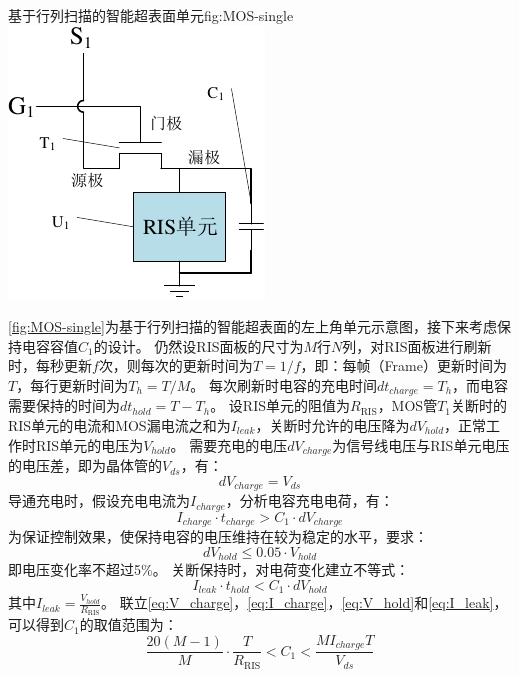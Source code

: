 \documentclass[supercite]{HustGraduPaper}
\begin{document}
\begin{generalfig}[htb]{基于行列扫描的智能超表面单元}{fig:MOS-single}
	\includegraphics[width=0.3\linewidth]{Figures/MOS-single.pdf}
\end{generalfig}

\autoref{fig:MOS-single}为基于行列扫描的智能超表面的左上角单元示意图，接下来考虑保持电容容值$C_1$的设计。
仍然设RIS面板的尺寸为$M$行$N$列，对RIS面板进行刷新时，每秒更新$f$次，则每次的更新时间为$T=1/f$，即：每帧（Frame）更新时间为$T$，每行更新时间为$T_h=T/M$。
每次刷新时电容的充电时间$dt_{charge}=T_h$，而电容需要保持的时间为$dt_{hold}=T-T_h$。
设RIS单元的阻值为$R_\mathrm{RIS}$，MOS管$T_1$关断时的RIS单元的电流和MOS漏电流之和为$I_{leak}$，关断时允许的电压降为$dV_{hold}$，正常工作时RIS单元的电压为$V_{hold}$。
需要充电的电压$dV_{charge}$为信号线电压与RIS单元电压的电压差，即为晶体管的$V_{ds}$，有：
\begin{equation}
	dV_{charge} = V_{ds}
	\label{eq:V_charge}
\end{equation}
导通充电时，假设充电电流为$I_{charge}$，分析电容充电电荷，有：
\begin{equation}
	I_{charge} \cdot t_{charge}>C_1 \cdot dV_{charge}
	\label{eq:I_charge}
\end{equation}
为保证控制效果，使保持电容的电压维持在较为稳定的水平，要求：
\begin{equation}
	dV_{hold} \le 0.05 \cdot V_{hold}
	\label{eq:V_hold}
\end{equation}
即电压变化率不超过5\%。
关断保持时，对电荷变化建立不等式：
\begin{equation}
	I_{leak} \cdot t_{hold} < C_1 \cdot dV_{hold}
	\label{eq:I_leak}
\end{equation}
其中$I_{leak} = \frac{V_{hold}}{R_\mathrm{RIS}}$。
联立\autoref{eq:V_charge}，\autoref{eq:I_charge}，\autoref{eq:V_hold}和\autoref{eq:I_leak}，可以得到$C_1$的取值范围为：
\begin{equation}
	\frac{20(M-1)}{M} \cdot \frac{T}{R_\mathrm{RIS}} < C_1 < \frac{MI_{charge}T}{V_{ds}}
	\label{eq:C1_value}
\end{equation}
\end{document}
